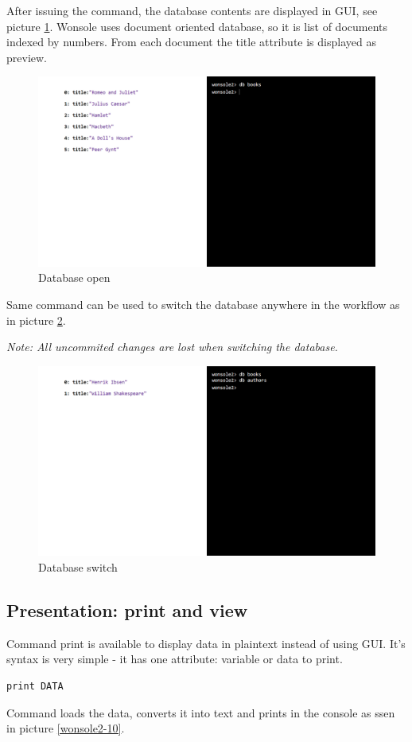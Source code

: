 After issuing the command, the database contents are displayed in GUI, see
picture \ref{wonsole2-02}.
Wonsole uses document oriented database, so it is list of documents indexed by numbers.
From each document the title attribute is displayed as preview.


\begin{figure}
\centering
\includegraphics[width=\textwidth]{../../manual/screenshot/wonsole2/wonsole2-02.png}
\caption{Database open}
\label{wonsole2-02}
\end{figure}

Same command can be used to switch the database anywhere in the workflow as in
picture \ref{wonsole2-04}.

\textit{Note: All uncommited changes are lost when switching the database.}

\begin{figure}
\centering
\includegraphics[width=\textwidth]{../../manual/screenshot/wonsole2/wonsole2-04.png}
\caption{Database switch}
\label{wonsole2-04}
\end{figure}

\subsection{Presentation: print and view}
Command print is available to display data in plaintext instead of using GUI.
It's syntax is very simple - it has one attribute: variable or data to print.
\begin{verbatim}
print DATA
\end{verbatim}
Command loads the data, converts it into text and prints in the console as ssen
in picture \ref{wonsole2-10}.

